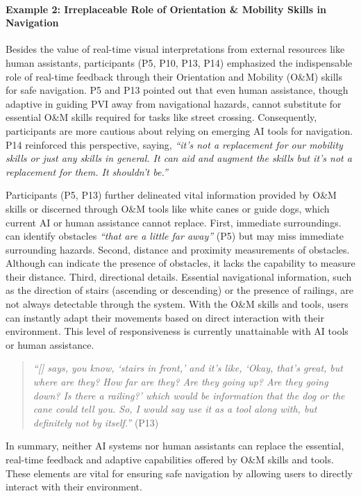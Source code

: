 \paragraph{Example 2: Irreplaceable Role of Orientation \& Mobility Skills in Navigation}


Besides the value of real-time visual interpretations from external resources like human assistants, participants (P5, P10, P13, P14) emphasized the indispensable role of real-time feedback through their Orientation and Mobility (O\&M) skills for safe navigation.
% 
P5 and P13 pointed out that even human assistance, though adaptive in guiding PVI away from navigational hazards, cannot substitute for essential O\&M skills required for tasks like street crossing.
Consequently, participants are more cautious about relying on emerging AI tools for navigation.
% 
P14 reinforced this perspective, saying, \textit{``it's not a replacement for our mobility skills or just any skills in general. It can aid and augment the skills but it's not a replacement for them. It shouldn't be.''} 



Participants (P5, P13) further delineated vital information provided by O\&M skills or discerned through O\&M tools like white canes or guide dogs, which current AI or human assistance cannot replace. 
First, immediate surroundings. \bma{} can identify obstacles \textit{``that are a little far away''} (P5) but may miss immediate surrounding hazards. 
Second, distance and proximity measurements of obstacles. Although \sbma{} can indicate the presence of obstacles, it lacks the capability to measure their distance.
Third, directional details. Essential navigational information, such as the direction of stairs (ascending or descending) or the presence of railings, are not always detectable through the system. 
% 
With the O\&M skills and tools, users can instantly adapt their movements based on direct interaction with their environment. This level of responsiveness is currently unattainable with AI tools or human assistance. 


\begin{quote}
    \textit{``[\bma] says, you know, `stairs in front,' and it's like, `Okay, that's great, but where are they? How far are they? Are they going up? Are they going down? Is there a railing?' which would be information that the dog or the cane could tell you. So, I would say use it as a tool along with, but definitely not by itself.''} (P13)
\end{quote}


In summary, neither AI systems nor human assistants can replace the essential, real-time feedback and adaptive capabilities offered by O\&M skills and tools. These elements are vital for ensuring safe navigation by allowing users to directly interact with their environment.
